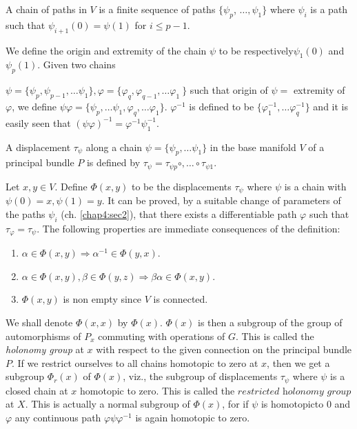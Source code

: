 \begin{defn}\label{chap4:sec3:def2}%
  A chain of paths in $V$ is a finite sequence of paths $\{\psi_p$,
  $\ldots, \psi_1 \}$ where $\psi_i$ is a path such that $\psi_{i + 1}
  (0) = \psi(1)$ for $i \le p-1$. 
\end{defn}

We define the origin and extremity of the chain $\psi$ to be
respectively\pageoriginale $\psi_1(0)$ and  $\psi_p(1)$. Given two chains 

 $\psi = \{ \psi_p, \psi_{p-1} ,\ldots \psi_1\}, \varphi =\{
\varphi_q, \varphi_{q-1}, \ldots \varphi_1 \ 
\}$ such that origin of $\psi=$ extremity of $\varphi$, we define
$\psi \varphi = \{ \psi_p, \ldots \psi_1, \varphi_q , \ldots \varphi_1
\}$. $\varphi^{-1}$ is defined to be $\{ \varphi^{-1}_1, \ldots
\varphi^{-1}_q \}$ and it is easily seen that $(\psi \varphi)^{-1}=
\varphi^{-1} \psi^{-1}_1$.

A displacement $\tau_{\psi}$ along a chain $\psi = \{ \psi_p, \ldots
\psi_1 \}$ in the base manifold $V$ of a principal bundle $P$ is
defined by $\tau_{\psi}= \tau_{\psi p }\circ , \ldots \circ \tau_{\psi
  1}$. 

Let $x, y \in V$. Define $\Phi (x, y)$ to be the displacements
$\tau_{\psi}$ where $\psi$ is a chain with $\psi (0) =x, \psi (1) =
y$. It can be proved, by a suitable change of parameters of the paths
$\psi_i$ (ch. \ref{chap4:sec2}), that there exists a differentiable path $\varphi$
such that $\tau_{\varphi} = \tau_{\psi}$. The following properties are
immediate consequences of the definition: 
\begin{enumerate}[1)]
\item $\alpha \in \Phi (x,y) \Longrightarrow \alpha^{-1} \in \Phi (y,x)$.
\item  $\alpha \in \Phi (x,y), \beta \in \Phi (y,z) \Longrightarrow
  \beta \alpha \in \Phi (x,y)$. 
\item $\Phi (x,y)$ is non empty since $V$ is connected.
\end{enumerate}

  We shall denote $\Phi (x, x)$ by $\Phi (x)$. $\Phi (x)$ is then a
  subgroup of the group of automorphisms of $P_x$ commuting with
  operations of $G$. This is called the \textit{ holonomy group } at
  $x$ with respect to the given connection on the principal bundle
  $P$. If we restrict ourselves to all chains homotopic to zero at
  $x$, then we get a subgroup $\Phi_r (x)$ of $\Phi (x)$, viz., the
  subgroup of displacements $\tau_{\psi}$ where $\psi$ is a closed
  chain at $x$ homotopic to zero. This is called the
  $\textit{restricted holonomy group}$ at $X$. This is actually a
  normal subgroup of $\Phi (x)$, for if $\psi$ is homotopic\pageoriginale to $0$ and
  $\varphi$ any continuous path $\varphi \psi \varphi^{-1}$ is again
  homotopic to zero. 

